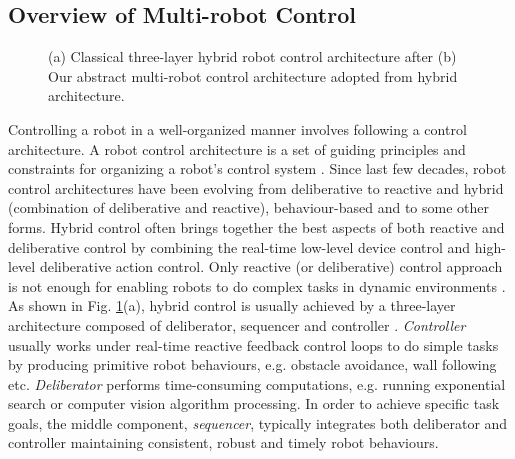 \documentclass{ifacconf}
\begin{document}
\subsection{Overview of Multi-robot Control}
 \begin{figure}
\centering
{} 
\hspace{0.25cm}
\caption{(a) Classical three-layer hybrid robot control architecture after \cite{Gat1997} 
(b) Our abstract multi-robot control architecture adopted from hybrid architecture.}
\label{fig:three-layer-arch}
\end{figure}
Controlling a robot in a well-organized manner involves following a control architecture. A robot control architecture is a set of guiding principles and constraints for organizing a robot's control system \citep{Mataric2007}. Since last few decades, robot control architectures have been evolving from deliberative to reactive and hybrid (combination of deliberative and reactive), behaviour-based and to some other forms.  Hybrid control often brings together the best aspects of both reactive and deliberative control by combining the real-time low-level device control and high-level deliberative action control. Only reactive (or deliberative) control approach is not enough for enabling robots to do complex tasks in dynamic environments \citep{Gat1997}.\\
 As shown in Fig. \ref{fig:three-layer-arch}(a), hybrid control is usually achieved by a three-layer architecture composed of deliberator, sequencer and controller . {\em Controller} usually works under real-time reactive feedback control loops to do simple tasks by producing primitive robot behaviours, e.g. obstacle avoidance, wall following etc. {\em Deliberator} performs time-consuming computations, e.g. running exponential search or computer vision algorithm processing. In order to achieve specific task goals, the middle component, {\em sequencer}, typically integrates both deliberator and controller maintaining consistent, robust and timely robot behaviours.\\
\end{document}
